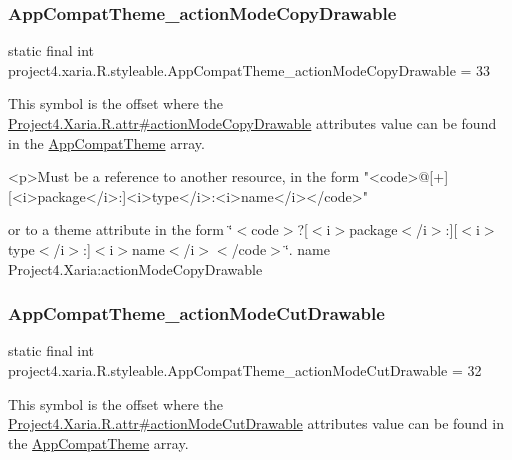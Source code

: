 \subsubsection{\texorpdfstring{App\+Compat\+Theme\+\_\+action\+Mode\+Copy\+Drawable}{AppCompatTheme\_actionModeCopyDrawable}}
{\footnotesize\ttfamily static final int project4.\+xaria.\+R.\+styleable.\+App\+Compat\+Theme\+\_\+action\+Mode\+Copy\+Drawable = 33\hspace{0.3cm}{\ttfamily [static]}}

This symbol is the offset where the \hyperlink{}{Project4.\+Xaria.\+R.\+attr\#action\+Mode\+Copy\+Drawable} attribute\textquotesingle{}s value can be found in the \hyperlink{classproject4_1_1xaria_1_1R_1_1styleable_aad8bec413e2350f9404e6ff0e831a85d}{App\+Compat\+Theme} array.

\begin{DoxyVerb}      <p>Must be a reference to another resource, in the form "<code>@[+][<i>package</i>:]<i>type</i>:<i>name</i></code>"
\end{DoxyVerb}
 or to a theme attribute in the form \char`\"{}$<$code$>$?\mbox{[}$<$i$>$package$<$/i$>$\+:\mbox{]}\mbox{[}$<$i$>$type$<$/i$>$\+:\mbox{]}$<$i$>$name$<$/i$>$$<$/code$>$\char`\"{}.  name Project4.\+Xaria\+:action\+Mode\+Copy\+Drawable \mbox{\label{classproject4_1_1xaria_1_1R_1_1styleable_aaaa9698521dccac48903def6aa3f1607}} 
\subsubsection{\texorpdfstring{App\+Compat\+Theme\+\_\+action\+Mode\+Cut\+Drawable}{AppCompatTheme\_actionModeCutDrawable}}
{\footnotesize\ttfamily static final int project4.\+xaria.\+R.\+styleable.\+App\+Compat\+Theme\+\_\+action\+Mode\+Cut\+Drawable = 32\hspace{0.3cm}{\ttfamily [static]}}

This symbol is the offset where the \hyperlink{}{Project4.\+Xaria.\+R.\+attr\#action\+Mode\+Cut\+Drawable} attribute\textquotesingle{}s value can be found in the \hyperlink{classproject4_1_1xaria_1_1R_1_1styleable_aad8bec413e2350f9404e6ff0e831a85d}{App\+Compat\+Theme} array.

